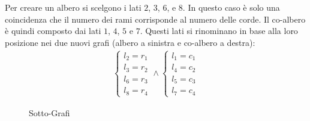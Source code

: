 \documentclass{article}
\numberwithin{equation}{subsection}
\begin{document}
Per creare un albero si scelgono i lati $2$, $3$, $6$, e $8$. In questo caso è solo una coincidenza che il numero dei rami corrisponde al numero delle corde. Il co-albero 
è quindi composto dai lati $1$, $4$, $5$ e $7$. Questi lati si rinominano in base alla loro posizione nei due nuovi grafi (albero a sinistra e co-albero a destra):
\begin{gather*}
    \begin{cases}
        l_2=r_1\\
        l_3=r_2\\
        l_6=r_3\\
        l_8=r_4
    \end{cases}\land
    \begin{cases}
        l_1=c_1\\
        l_4=c_2\\
        l_5=c_3\\
        l_7=c_4
    \end{cases}
\end{gather*}
\begin{figure}[H]%
    \centering
    \qquad
    \caption{Sotto-Grafi}%
    \label{fig:albero-co-albero}
\end{figure}
\end{document}
